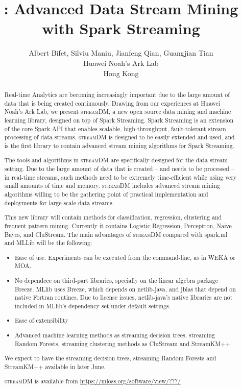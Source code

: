 \documentclass[a4paper,10pt]{article}
\title{\streamdm: Advanced Data Stream Mining with Spark Streaming}
\author{Albert Bifet, Silviu Maniu, Jianfeng Qian, Guangjian Tian\\
Huawei Noah's Ark Lab \\
Hong Kong
}
\def\streamdm{\textsc{streamDM}\xspace}
\begin{document}
\maketitle

\begin{abstract}


Real-time Analytics are becoming increasingly important due to the large amount of data that is being created continuously. Drawing from our experiences at Huawei Noah’s Ark Lab, we present \streamdm, a new open source data mining and machine learning library, designed on top of Spark Streaming.
Spark Streaming is an extension of the core Spark API that enables scalable, high-throughput, fault-tolerant stream processing of data streams.
\streamdm is designed to be easily extended and used, and is the first library to contain advanced stream mining algorithms for Spark Streaming. 
 
The tools and algorithms in \streamdm are specifically designed for the data stream setting. Due to the large amount of data that is created – and needs to be processed – in real-time streams, such methods need to be extremely time-efficient while using very small amounts of time and memory. \streamdm includes advanced stream mining algorithms willing to be the gathering point of practical implementation and deployments for large-scale data streams.

This new library will contain methods for classification, regression, clustering and frequent pattern mining. Currently it contains Logistic Regression, Perceptron, Naive Bayes, and CluStream. The main advantages of \streamdm compared with spark.ml and MLLib will be the following:
\begin{itemize}
 \item Ease of use. Experiments can be executed from the command-line, as in WEKA or MOA.
 \item No dependece on third-part libraries, specially on the linear algebra package Breeze. MLlib uses  Breeze, which depends on netlib-java, and jblas that depend on native Fortran routines. Due to license issues, netlib-java’s native libraries are not included in MLlib’s dependency set under default settings. 
 \item Ease of extensibility
 \item Advanced machine learning methods as streaming decision trees, streaming Random Forests, streaming clustering methods as CluStream and StreamKM++. 
\end{itemize}

We expect to have the streaming decision trees, streaming Random Forests and StreamKM++ available in later June.

\streamdm is available from \url{https://mloss.org/software/view/???/}

\end{abstract}
\end{document}
